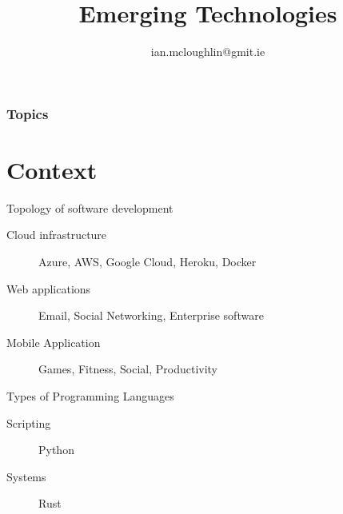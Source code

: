 
\title{Emerging Technologies}
\subtitle{}
\author{ian.mcloughlin@gmit.ie}
\date{}


\begin{frame}
  \titlepage
\end{frame}

\begin{frame}
  \frametitle{Topics}
  \tableofcontents
\end{frame}

\section{Context}




\begin{frame}{Topology of software development}
  \begin{description}
    \item[Cloud infrastructure] Azure, AWS, Google Cloud, Heroku, Docker
    \vspace{0.25cm}
    \item[Web applications] Email, Social Networking, Enterprise software
    \vspace{0.25cm}
    \item[Mobile Application] Games, Fitness, Social, Productivity
  \end{description}
\end{frame}


\begin{frame}{Types of Programming Languages}
  \begin{description}
    \item[Scripting] Python
    \vspace{0.25cm}
    \item[Systems] Rust
  \end{description}
\end{frame}


